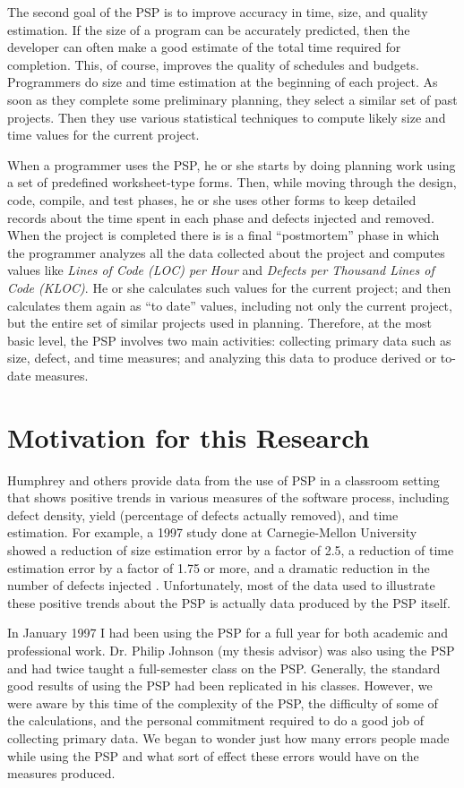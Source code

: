 The second goal of the PSP is to improve accuracy in time, size, and
quality estimation.  If the size of a program can be accurately predicted,
then the developer can often make a good estimate of the total time
required for completion.  This, of course, improves the quality of
schedules and budgets.  Programmers do size and time estimation at the
beginning of each project.  As soon as they complete some preliminary
planning, they select a similar set of past projects.  Then they use
various statistical techniques to compute likely size and time values for
the current project.

When a programmer uses the PSP, he or she starts by doing planning work
using a set of predefined worksheet-type forms.  Then, while moving through
the design, code, compile, and test phases, he or she uses other forms to
keep detailed records about the time spent in each phase and defects
injected and removed.  When the project is completed there is is a final
``postmortem'' phase in which the programmer analyzes all the data
collected about the project and computes values like {\it Lines of Code
  (LOC) per Hour} and {\it Defects per Thousand Lines of Code (KLOC)}.  He
or she calculates such values for the current project; and then calculates
them again as ``to date'' values, including not only the current project,
but the entire set of similar projects used in planning.  Therefore, at the
most basic level, the PSP involves two main activities: collecting primary
data such as size, defect, and time measures; and analyzing this data to
produce derived or to-date measures.

\section{Motivation for this Research}

Humphrey and others provide data from the use of PSP in a classroom setting
that shows positive trends in various measures of the software process,
including defect density, yield (percentage of defects actually removed),
and time estimation.  For example, a 1997 study done at Carnegie-Mellon
University showed a reduction of size estimation error by a factor of 2.5,
a reduction of time estimation error by a factor of 1.75 or more, and a
dramatic reduction in the number of defects injected \cite{CMU97}.
Unfortunately, most of the data used to illustrate these positive trends
about the PSP is actually data produced by the PSP itself.

In January 1997 I had been using the PSP for a full year for both academic
and professional work.  Dr. Philip Johnson (my thesis advisor) was also using
the PSP and had twice taught a full-semester class on the PSP. Generally,
the standard good results of using the PSP had been replicated in his
classes.  However, we were aware by this time of the complexity of the PSP, the
difficulty of some of the calculations, and the personal commitment
required to do a good job of collecting primary data.  We began to wonder
just how many errors people made while using the PSP and what sort of
effect these errors would have on the measures produced.
     

